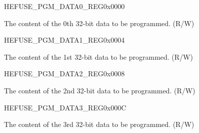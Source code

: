 \begin{register}{H}{EFUSE\_PGM\_DATA0\_REG}{0x0000}\label{regdesc:EFUSEPGMDATA0REG}
%
\regnewline%
\begin{regdesc}\begin{reglist}
\label{fielddesc:EFUSEPGMDATA0}\item [EFUSE\_PGM\_DATA\_0] The content of the 0th 32-bit data to be programmed. (R/W)
\end{reglist}\end{regdesc}
\end{register}


\begin{register}{H}{EFUSE\_PGM\_DATA1\_REG}{0x0004}\label{regdesc:EFUSEPGMDATA1REG}
%
\regnewline%
\begin{regdesc}\begin{reglist}
\label{fielddesc:EFUSEPGMDATA1}\item [EFUSE\_PGM\_DATA\_1] The content of the 1st 32-bit data to be programmed. (R/W)
\end{reglist}\end{regdesc}
\end{register}


\begin{register}{H}{EFUSE\_PGM\_DATA2\_REG}{0x0008}\label{regdesc:EFUSEPGMDATA2REG}
%
\regnewline%
\begin{regdesc}\begin{reglist}
\label{fielddesc:EFUSEPGMDATA2}\item [EFUSE\_PGM\_DATA\_2] The content of the 2nd 32-bit data to be programmed. (R/W)
\end{reglist}\end{regdesc}
\end{register}


\begin{register}{H}{EFUSE\_PGM\_DATA3\_REG}{0x000C}\label{regdesc:EFUSEPGMDATA3REG}
%
\regnewline%
\begin{regdesc}\begin{reglist}
\label{fielddesc:EFUSEPGMDATA3}\item [EFUSE\_PGM\_DATA\_3] The content of the 3rd 32-bit data to be programmed. (R/W)
\end{reglist}\end{regdesc}
\end{register}


